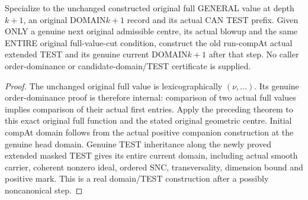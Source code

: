 \begin{theorem}
\label{hir:original-full-value-cut-next-companion-test-domain}
\leanok
Specialize to the unchanged constructed original full GENERAL value at depth
$k+1$, an original DOMAIN$k+1$ record and its actual CAN TEST prefix. Given
ONLY a genuine next original admissible centre, its actual blowup and the
same ENTIRE original full-value-cut condition, construct the old run-compAt
actual extended TEST and its genuine current DOMAIN$k+1$ after that step.
No caller order-dominance or candidate-domain/TEST certificate is supplied.
\end{theorem}
\begin{proof}
The unchanged original full value is lexicographically $(\nu,\ldots)$.
Its genuine order-dominance proof is therefore internal: comparison of two
actual full values implies comparison of their actual first entries.
Apply the preceding theorem to this exact original full function and the
stated original geometric centre. Initial compAt domain follows from the
actual positive companion construction at the genuine head domain. Genuine
TEST inheritance along the newly proved extended masked TEST gives its
entire current domain, including actual smooth carrier, coherent nonzero
ideal, ordered SNC, transversality, dimension bound and positive mark. This
is a real domain/TEST construction after a possibly noncanonical step.
\end{proof}

